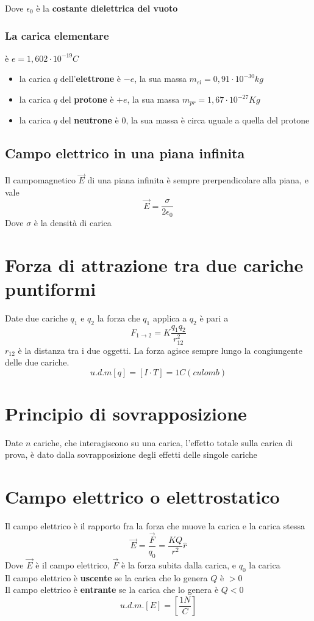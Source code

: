 \documentclass[a4paper]{report}
\begin{document}
  Dove $\epsilon_0$ è la \textbf{costante dielettrica del vuoto}
  \subsubsection{La carica elementare}
  è $e = 1,602 \cdot 10^{-19} C$
  \begin{itemize}
    \item la carica $q$ dell'\textbf{elettrone} è $-e$, la sua massa $m_{el} = 0,91 \cdot 10^{-30} kg$
    \item la carica $q$ del \textbf{protone} è $+e$, la sua massa $m_{pr} = 1,67 \cdot 10^{-27} Kg$
    \item la carica $q$ del \textbf{neutrone} è $0$, la sua massa è circa uguale a quella del protone
  \end{itemize}

  \subsection{Campo elettrico in una piana infinita}
  Il campomagnetico $\vec{E}$ di una piana infinita è sempre prerpendicolare alla piana, e vale
  $$ \vec{E} = \frac{\sigma}{2\epsilon_0} $$
  Dove $\sigma$ è la densità di carica

  \section{Forza di attrazione tra due cariche puntiformi}
  Date due cariche $q_1$ e $q_2$ la forza che $q_1$ applica a $q_2$ è pari a
  $$ F_{1 \rightarrow 2} = K \frac{q_1 q_2}{r_{12}^2} $$
  $r_{12}$ è la distanza tra i due oggetti. La forza agisce sempre lungo la congiungente delle due cariche.
  $$u.d.m[q] = [I\cdot T] = 1C (culomb)$$

  \section{Principio di sovrapposizione}
  Date $n$ cariche, che interagiscono su una carica, l'effetto totale sulla carica di prova, è dato dalla sovrapposizione degli effetti delle singole cariche

  \section{Campo elettrico o elettrostatico}
  Il campo elettrico è il rapporto fra la forza che muove la carica e la carica stessa
  $$\vec{E} = \frac{\vec{F}}{q_0} = \frac{K Q}{r^2} \hat{r}$$
  Dove $\vec{E}$ è il campo elettrico, $\vec{F}$ è la forza subita dalla carica, e $q_0$ la carica\\
  Il campo elettrico è \textbf{uscente} se la carica che lo genera $Q$ è $>0$\\
  Il campo elettrico è \textbf{entrante} se la carica che lo genera è $Q<0$
  $$ u.d.m.[E] = [\frac{1N}{C}]$$
\end{document}
